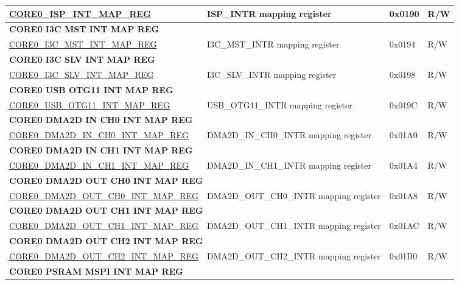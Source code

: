 \begin{longtable}{ | p{7.5cm} | p{7.2cm} | p{1.3cm} | p{1cm} | }
\hyperref[regdesc:CORE0ISPINTMAPREG]{CORE0\_ISP\_INT\_MAP\_REG} & ISP\_INTR mapping register & 0x0190 & R/W \\ \hline
\multicolumn{4}{|l|}{\textbf{CORE0 I3C MST INT MAP REG}} \\ \hline
\hyperref[regdesc:CORE0I3CMSTINTMAPREG]{CORE0\_I3C\_MST\_INT\_MAP\_REG} & I3C\_MST\_INTR mapping register & 0x0194 & R/W \\ \hline
\multicolumn{4}{|l|}{\textbf{CORE0 I3C SLV INT MAP REG}} \\ \hline
\hyperref[regdesc:CORE0I3CSLVINTMAPREG]{CORE0\_I3C\_SLV\_INT\_MAP\_REG} & I3C\_SLV\_INTR mapping register & 0x0198 & R/W \\ \hline
\multicolumn{4}{|l|}{\textbf{CORE0 USB OTG11 INT MAP REG}} \\ \hline
\hyperref[regdesc:CORE0USBOTG11INTMAPREG]{CORE0\_USB\_OTG11\_INT\_MAP\_REG} & USB\_OTG11\_INTR mapping register & 0x019C & R/W \\ \hline
\multicolumn{4}{|l|}{\textbf{CORE0 DMA2D IN CH0 INT MAP REG}} \\ \hline
\hyperref[regdesc:CORE0DMA2DINCH0INTMAPREG]{CORE0\_DMA2D\_IN\_CH0\_INT\_MAP\_REG} & DMA2D\_IN\_CH0\_INTR mapping register & 0x01A0 & R/W \\ \hline
\multicolumn{4}{|l|}{\textbf{CORE0 DMA2D IN CH1 INT MAP REG}} \\ \hline
\hyperref[regdesc:CORE0DMA2DINCH1INTMAPREG]{CORE0\_DMA2D\_IN\_CH1\_INT\_MAP\_REG} & DMA2D\_IN\_CH1\_INTR mapping register & 0x01A4 & R/W \\ \hline
\multicolumn{4}{|l|}{\textbf{CORE0 DMA2D OUT CH0 INT MAP REG}} \\ \hline
\hyperref[regdesc:CORE0DMA2DOUTCH0INTMAPREG]{CORE0\_DMA2D\_OUT\_CH0\_INT\_MAP\_REG} & DMA2D\_OUT\_CH0\_INTR mapping register & 0x01A8 & R/W \\ \hline
\multicolumn{4}{|l|}{\textbf{CORE0 DMA2D OUT CH1 INT MAP REG}} \\ \hline
\hyperref[regdesc:CORE0DMA2DOUTCH1INTMAPREG]{CORE0\_DMA2D\_OUT\_CH1\_INT\_MAP\_REG} & DMA2D\_OUT\_CH1\_INTR mapping register & 0x01AC & R/W \\ \hline
\multicolumn{4}{|l|}{\textbf{CORE0 DMA2D OUT CH2 INT MAP REG}} \\ \hline
\hyperref[regdesc:CORE0DMA2DOUTCH2INTMAPREG]{CORE0\_DMA2D\_OUT\_CH2\_INT\_MAP\_REG} & DMA2D\_OUT\_CH2\_INTR mapping register & 0x01B0 & R/W \\ \hline
\multicolumn{4}{|l|}{\textbf{CORE0 PSRAM MSPI INT MAP REG}} \\ \hline

\end{longtable}
